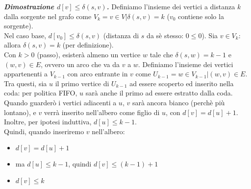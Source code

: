 \documentclass[11pt]{article}
\theoremstyle{remark}
\begin{document}
\textit{\textbf{Dimostrazione $d[v] \leq \delta(s,v)$.}} Definiamo l'insieme dei vertici a distanza $k$ dalla sorgente nel grafo 
come $V_k={v\in V|\delta(s,v)=k}$ ($v_0$ contiene solo la sorgente).\\ Nel caso base, $d[v_0]\leq \delta(s,v)$ (distanza di 
$s$ da sè stesso: $0\leq 0$). Sia $v\in V_k$: allora $\delta(s,v)=k$ (per definizione).\\ Con $k>0$ (passo), esisterà almeno 
un vertice $w$ tale che $\delta(s,w)=k-1$ e $(w,v)\in E$, ovvero un arco che va da $v$ a $w$. Definiamo l'insieme dei vertici 
appartenenti a $V_{k-1}$ con arco entrante in $v$ come $U_{k-1}={w\in V_{k-1}|(w,v)\in E}$. Tra questi, sia $u$ il primo 
vertice di $U_{k-1}$ ad essere scoperto ed inserito nella coda: per politica FIFO, $u$ sarà anche il primo ad essere estratto
dalla coda. Quando guarderò i vertici adiacenti a $u$, $v$ sarà ancora bianco (perchè più lontano), e $v$ verrà inserito 
nell'albero come figlio di $u$, con $d[v]=d[u]+1$. Inoltre, per ipotesi induttiva, $d[u]\leq k-1$.\\
Quindi, quando inseriremo $v$ nell'albero:
\begin{itemize}
    \item $d[v]=d[u]+1$
    \item ma $d[u]\leq k-1$, quindi $d[v]\leq (k-1)+1$
    \item $d[v]\leq k$
\end{itemize}
\end{document}
